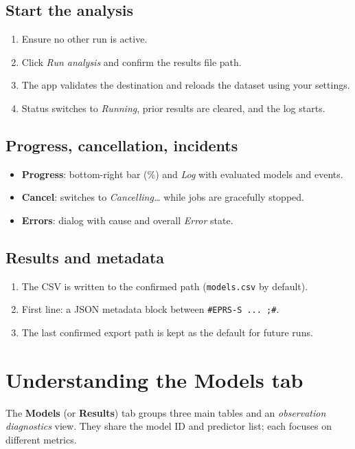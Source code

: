 \documentclass[12pt,a4paper]{article}
\begin{document}
\subsection{Start the analysis}
\begin{enumerate}
  \item Ensure no other run is active.
  \item Click \emph{Run analysis} and confirm the results file path.
  \item The app validates the destination and reloads the dataset using your settings.
  \item Status switches to \emph{Running}, prior results are cleared, and the log starts.
\end{enumerate}

\subsection{Progress, cancellation, incidents}
\begin{itemize}
  \item \textbf{Progress}: bottom-right bar (\%) and \emph{Log} with evaluated models and events.
  \item \textbf{Cancel}: switches to \emph{Cancelling…} while jobs are gracefully stopped.
  \item \textbf{Errors}: dialog with cause and overall \emph{Error} state.
\end{itemize}

\subsection{Results and metadata}
\begin{enumerate}
  \item The CSV is written to the confirmed path (\texttt{models.csv} by default).
  \item First line: a JSON metadata block between \verb|#EPRS-S ... ;#|.
  \item The last confirmed export path is kept as the default for future runs.
\end{enumerate}

\section{Understanding the \textbf{Models} tab}
The \textbf{Models} (or \textbf{Results}) tab groups three main tables and an \textit{observation diagnostics} view. They share the model ID and predictor list; each focuses on different metrics.
\end{document}
